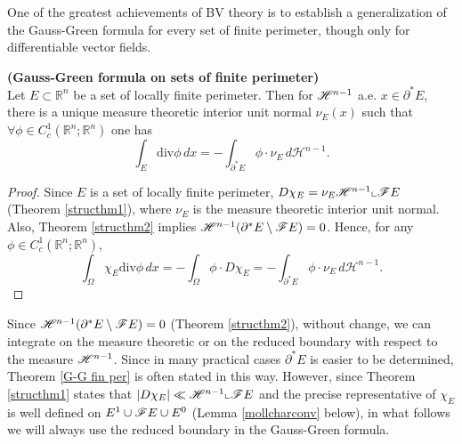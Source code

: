 One of the greatest achievements of BV theory is to establish a generalization of the Gauss-Green formula for every set of finite perimeter, though only for differentiable vector fields. 

\begin{theorem} \label{G-G fin per} {\bf (Gauss-Green formula on sets of finite perimeter)}
\\
Let $E \subset \mathbb{R}^{n}$ be a set of locally finite perimeter. Then for $\mathscr{H}^{n-1}$ a.e. $x \in \partial^{*} E$, there is a unique measure theoretic interior unit normal $\nu_{E}(x)$ such that $\forall \phi \in C_{c}^{1}(\mathbb{R}^{n}; \mathbb{R}^{n})$ one has
\[ \int_{E} \mathrm{div}\phi\, dx = - \int_{\partial^{*} E} \phi \cdot \nu_{E}\, d\mathcal{H}^{n-1}. \]
\end{theorem}
\begin{proof} Since $E$ is a set of locally finite perimeter, $D \chi_{E} = \nu_{E} \mathscr{H}^{n - 1} \llcorner \mathscr{F} E$ (Theorem \ref{structhm1}), where $\nu_{E}$ is the measure theoretic interior unit normal. Also, Theorem \ref{structhm2} implies $\mathscr{H}^{n - 1}(\partial^{*} E \setminus \mathscr{F} E) = 0$. Hence, for any $\phi \in C^{1}_{c}(\mathbb{R}^{n}; \mathbb{R}^{n})$,
\[ \int_{\Omega} \chi_{E} \mathrm{div}\phi\, dx = - \int_{\Omega} \phi \cdot D \chi_{E} = - \int_{\partial^{*} E} \phi \cdot \nu_{E}\, d\mathcal{H}^{n-1}. \]
\end{proof}

\begin{remark} Since $\mathscr{H}^{n - 1} (\partial^{*} E \setminus \mathscr{F} E) = 0$ (Theorem \ref{structhm2}), without change, we can integrate on the measure theoretic or on the reduced boundary with respect to the measure $\mathscr{H}^{n - 1}$. Since in many practical cases $\partial^{*} E$ is easier to be determined, Theorem \ref{G-G fin per} is often stated in this way. However, since Theorem \ref{structhm1} states that $|D \chi_{E}| \ll \mathscr{H}^{n - 1} \llcorner \mathscr{F} E$ and the precise representative of $\chi_{E}$ is well defined on $E^{1} \cup \mathscr{F} E \cup E^{0}$ (Lemma \ref{mollcharconv} below), in what follows we will always use the reduced boundary in the Gauss-Green formula.
\end{remark}

